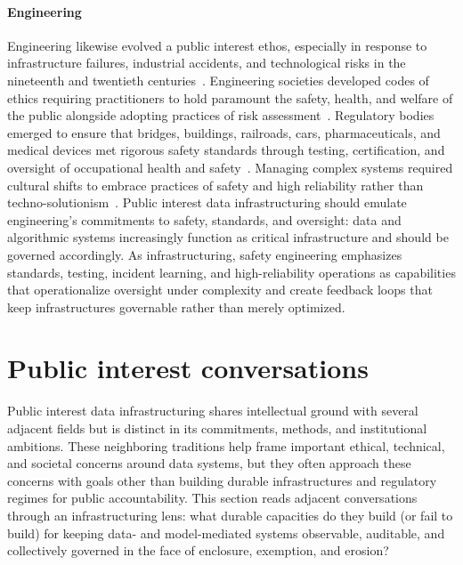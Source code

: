 \documentclass[acmsmall,screen]{acmart}
\begin{document}
\paragraph*{Engineering}
Engineering likewise evolved a public interest ethos, especially in response to infrastructure failures, industrial accidents, and technological risks in the nineteenth and twentieth centuries~\cite{petroski1992engineer,perrow1984normal,vaughan1996challenger,dekkerDriftFailureHunting2016}. Engineering societies developed codes of ethics requiring practitioners to hold paramount the safety, health, and welfare of the public alongside adopting practices of risk assessment~\cite{nathwaniThreePrinciplesManaging1995,boudiaIntroductionRiskRisk2007}. Regulatory bodies emerged to ensure that bridges, buildings, railroads, cars, pharmaceuticals, and medical devices met rigorous safety standards through testing, certification, and oversight of occupational health and safety~\cite{abramsShortHistoryOccupational2001}. Managing complex systems required cultural shifts to embrace practices of safety and high reliability rather than techno-solutionism~\cite{weickOrganizingHighReliability1999,haleWorkingRuleWorkingI2013,haleWorkingRuleWorkingII2013}. Public interest data infrastructuring should emulate engineering's commitments to safety, standards, and oversight: data and algorithmic systems increasingly function as critical infrastructure and should be governed accordingly. As infrastructuring, safety engineering emphasizes standards, testing, incident learning, and high-reliability operations as capabilities that operationalize oversight under complexity and create feedback loops that keep infrastructures governable rather than merely optimized.

\section*{Public interest conversations}
Public interest data infrastructuring shares intellectual ground with several adjacent fields but is distinct in its commitments, methods, and institutional ambitions. These neighboring traditions help frame important ethical, technical, and societal concerns around data systems, but they often approach these concerns with goals other than building durable infrastructures and regulatory regimes for public accountability. This section reads adjacent conversations through an infrastructuring lens: what durable capacities do they build (or fail to build) for keeping data- and model-mediated systems observable, auditable, and collectively governed in the face of enclosure, exemption, and erosion?
\end{document}
